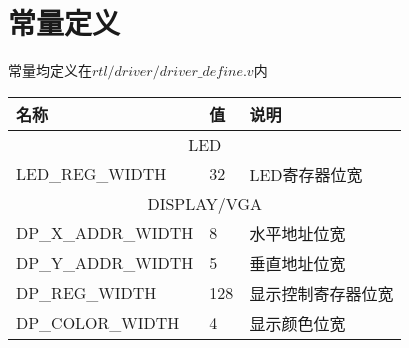 \section{常量定义}
常量均定义在$rtl/driver/driver\_define.v$内\\
\begin{center}
\begin{tabular}{|l|p{3cm}|p{6cm}|}
    \hline
    名称    &   值  &   说明\\\hline
    \multicolumn{3}{|c|}{LED}\\\hline
    LED\_REG\_WIDTH   &   32  &   LED寄存器位宽\\\hline
    \multicolumn{3}{|c|}{DISPLAY/VGA}\\\hline
    DP\_X\_ADDR\_WIDTH   &   8  &   水平地址位宽\\\hline
    DP\_Y\_ADDR\_WIDTH   &   5  &   垂直地址位宽\\\hline
    DP\_REG\_WIDTH   &   128  &   显示控制寄存器位宽\\\hline
    DP\_COLOR\_WIDTH   &   4  &   显示颜色位宽\\\hline
\end{tabular}
\end{center}